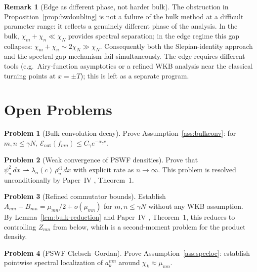 \documentclass[12pt,a4paper]{amsart}
\theoremstyle{definition}
\newtheorem{remark}[theorem]{Remark}
\newtheorem{problem}{Problem}[section]
\newcommand{\Eout}{\mathcal{E}_{\mathrm{out}}}
\newcommand{\mumN}{\mu_{mn}}
\newcommand{\rhocl}{\rho_n^{\mathrm{cl}}}
\begin{document}
\begin{remark}[Edge as different phase, not harder bulk]\label{rem:edge-structural}
The obstruction in Proposition~\ref{prop:bwdoubling} is not a
failure of the bulk method at a difficult parameter range:
it reflects a genuinely different phase of the analysis.
In the bulk, $\chi_m + \chi_n \ll \chi_N$ provides spectral
separation; in the edge regime this gap collapses:
$\chi_m + \chi_n \sim 2\chi_N \gg \chi_N$.
Consequently both the Slepian-identity approach and the
spectral-gap mechanism fail simultaneously.
The edge requires different tools (e.g.\ Airy-function
asymptotics or a refined WKB analysis near the classical turning
points at $x = \pm T$); this is left as a separate program.
\end{remark}

\section{Open Problems}\label{sec:open}

\begin{problem}[Bulk convolution decay]\label{prob:bulkconv}
Prove Assumption~\ref{ass:bulkconv}: for $m,n \le \gamma N$,
$\Eout(f_{mn}) \le C_\gamma e^{-\alpha_\gamma c}$.
\end{problem}

\begin{problem}[Weak convergence of PSWF densities]\label{prob:pswf-weak-limit}
Prove that $\psi_n^2\,dx \rightharpoonup \lambda_n(c)\,\rhocl\,dx$
with explicit rate as $n \to \infty$.
This problem is resolved unconditionally by Paper~IV
\cite{PaperIV}, Theorem~1.
\end{problem}

\begin{problem}[Refined commutator bounds]\label{prob:comm-refined}
Establish $A_{mn}+B_{mn} = \mumN/2 + o(\mumN)$
for $m,n \le \gamma N$ without any WKB assumption.
By Lemma~\ref{lem:bulk-reduction} and Paper~IV \cite{PaperIV},
Theorem~1, this reduces to controlling $Z_{mn}$ from below,
which is a second-moment problem for the product density.
\end{problem}

\begin{problem}[PSWF Clebsch--Gordan]\label{prob:cg}
Prove Assumption~\ref{ass:specloc}: establish pointwise
spectral localization of $a_k^{mn}$ around $\chi_k \approx \mumN$.
\end{problem}
\end{document}
